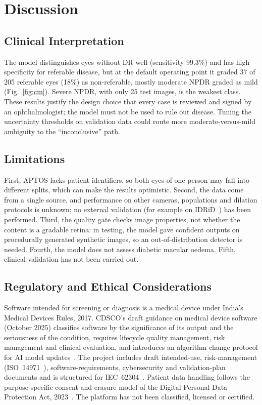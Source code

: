 \documentclass[conference]{IEEEtran}
\begin{document}
\section{Discussion}
\subsection{Clinical Interpretation}
The model distinguishes eyes without DR well (sensitivity 99.3\%) and has high specificity for referable disease, but
at the default operating point it graded 37 of 205 referable eyes (18\%) as non-referable, mostly moderate NPDR graded
as mild (Fig.~\ref{fig:cm}). Severe NPDR, with only 25 test images, is the weakest class. These results justify the
design choice that every case is reviewed and signed by an ophthalmologist; the model must not be used to rule out
disease. Tuning the uncertainty thresholds on validation data could route more moderate-versus-mild ambiguity to the
``inconclusive'' path.

\subsection{Limitations}
First, APTOS lacks patient identifiers, so both eyes of one person may fall into different splits, which can make the
results optimistic. Second, the data come from a single source, and performance on other cameras, populations and
dilation protocols is unknown; no external validation (for example on IDRiD~\cite{porwal2018}) has been performed.
Third, the quality gate checks image properties, not whether the content is a gradable retina: in testing, the model
gave confident outputs on procedurally generated synthetic images, so an out-of-distribution detector is needed.
Fourth, the model does not assess diabetic macular oedema. Fifth, clinical validation has not been carried out.

\subsection{Regulatory and Ethical Considerations}
Software intended for screening or diagnosis is a medical device under India's Medical Devices Rules, 2017. CDSCO's
draft guidance on medical device software (October 2025) classifies software by the significance of its output and
the seriousness of the condition, requires lifecycle quality management, risk management and clinical evaluation, and
introduces an algorithm change protocol for AI model updates~\cite{cdsco2025}. The project includes draft
intended-use, risk-management (ISO~14971~\cite{iso14971}), software-requirements, cybersecurity and validation-plan
documents and is structured for IEC~62304~\cite{iec62304}. Patient data handling follows the purpose-specific consent
and erasure model of the Digital Personal Data Protection Act, 2023~\cite{dpdp2023}. The platform has not been
classified, licensed or certified.
\end{document}
